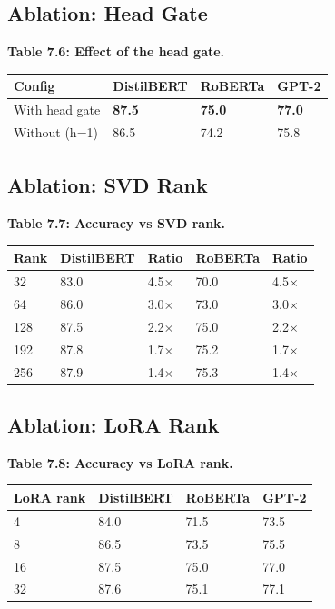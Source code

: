 \subsection{Ablation: Head Gate}

\textbf{Table 7.6: Effect of the head gate.}

\begin{table}[H]
\centering
\small
\begin{tabular}{llll}
\toprule
\textbf{Config} & \textbf{DistilBERT} & \textbf{RoBERTa} & \textbf{GPT-2} \\
\midrule
With head gate & \textbf{87.5} & \textbf{75.0} & \textbf{77.0} \\
Without (h=1) & 86.5 & 74.2 & 75.8 \\
\bottomrule
\end{tabular}
\end{table}

\subsection{Ablation: SVD Rank}

\textbf{Table 7.7: Accuracy vs SVD rank.}

\begin{table}[H]
\centering
\small
\begin{tabular}{lllll}
\toprule
\textbf{Rank} & \textbf{DistilBERT} & \textbf{Ratio} & \textbf{RoBERTa} & \textbf{Ratio} \\
\midrule
32 & 83.0 & 4.5$\times$ & 70.0 & 4.5$\times$ \\
64 & 86.0 & 3.0$\times$ & 73.0 & 3.0$\times$ \\
128 & 87.5 & 2.2$\times$ & 75.0 & 2.2$\times$ \\
192 & 87.8 & 1.7$\times$ & 75.2 & 1.7$\times$ \\
256 & 87.9 & 1.4$\times$ & 75.3 & 1.4$\times$ \\
\bottomrule
\end{tabular}
\end{table}

\subsection{Ablation: LoRA Rank}

\textbf{Table 7.8: Accuracy vs LoRA rank.}

\begin{table}[H]
\centering
\small
\begin{tabular}{llll}
\toprule
\textbf{LoRA rank} & \textbf{DistilBERT} & \textbf{RoBERTa} & \textbf{GPT-2} \\
\midrule
4 & 84.0 & 71.5 & 73.5 \\
8 & 86.5 & 73.5 & 75.5 \\
16 & 87.5 & 75.0 & 77.0 \\
32 & 87.6 & 75.1 & 77.1 \\
\bottomrule
\end{tabular}
\end{table}

